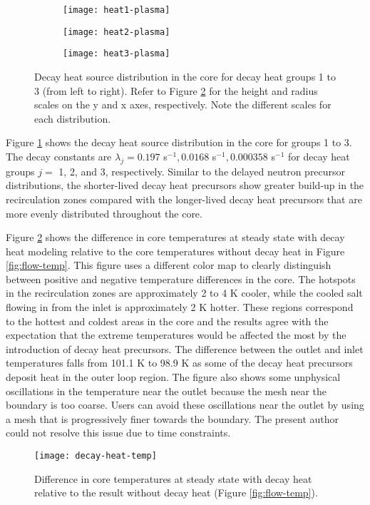 \begin{figure}[htbp!]
    \centering
    \begin{subfigure}[t]{.325\textwidth}
        \centering
        \texttt{[image: heat1-plasma]}
    \end{subfigure}
    \begin{subfigure}[t]{.325\textwidth}
        \centering
        \texttt{[image: heat2-plasma]}
    \end{subfigure}
    \begin{subfigure}[t]{.325\textwidth}
        \centering
        \texttt{[image: heat3-plasma]}
    \end{subfigure}
    \caption{Decay heat source distribution in the core for decay heat groups
    1 to 3 (from left to right). Refer to Figure \ref{fig:decayheattemp} for
    the height and radius scales on the y and x axes, respectively. Note the
    different scales for each distribution.}
    \label{fig:decayheat}
\end{figure}

Figure \ref{fig:decayheat} shows the decay heat source distribution in the
core for groups 1 to 3. The decay constants are $\lambda_j = 0.197$ s$^{-1},
0.0168$ s$^{-1}, 0.000358$ s$^{-1}$ for decay heat groups $j=$ 1, 2, and 3,
respectively.
Similar to the delayed neutron precursor distributions, the shorter-lived
decay heat precursors show greater build-up in the recirculation zones
compared with the longer-lived decay heat precursors that are more evenly
distributed throughout the core.

Figure \ref{fig:decayheattemp} shows the
difference in core temperatures at steady state with decay heat modeling
relative to the core temperatures without decay heat in Figure
\ref{fig:flow-temp}. This figure uses a different color map to clearly
distinguish between positive and negative temperature differences in the core.
The hotspots in the recirculation zones are approximately
2 to 4 K cooler, while the cooled salt flowing in from the inlet is
approximately 2 K hotter. These regions correspond to the hottest and coldest
areas in the core and the results agree with the expectation that the extreme
temperatures would be affected the most by the introduction of decay heat
precursors. The difference between the outlet and inlet temperatures falls
from 101.1 K to 98.9 K as some of the decay heat precursors deposit heat in
the outer loop region. The figure also shows some unphysical oscillations in
the temperature near the outlet because the mesh near the boundary is too
coarse. Users can avoid these oscillations near the outlet by using a mesh
that is progressively finer towards the boundary. The
present author could not resolve this issue due to time constraints.

\begin{figure}[htbp!]
    \centering
    \texttt{[image: decay-heat-temp]}
    \caption{Difference in core temperatures at steady state with decay heat
    relative to the result without decay heat (Figure \ref{fig:flow-temp}).}
    \label{fig:decayheattemp}
\end{figure}
